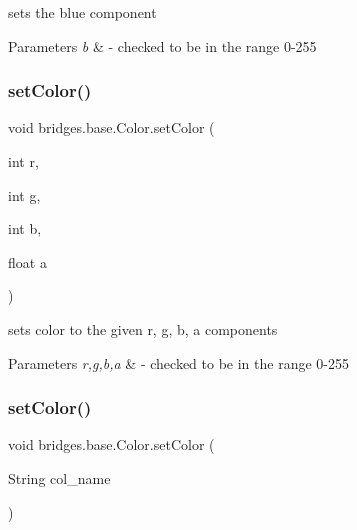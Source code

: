 sets the blue component


\begin{DoxyParams}{Parameters}
{\em b} & -\/ checked to be in the range 0-\/255 \\
\hline
\end{DoxyParams}
\hypertarget{classbridges_1_1base_1_1_color_a5559b1c7eb4c3901526b1012029b528f}{}\label{classbridges_1_1base_1_1_color_a5559b1c7eb4c3901526b1012029b528f} 
\subsubsection{\texorpdfstring{set\+Color()}{setColor()}\hspace{0.1cm}{\footnotesize\ttfamily [1/2]}}
{\footnotesize\ttfamily void bridges.\+base.\+Color.\+set\+Color (\begin{DoxyParamCaption}\item[{int}]{r,  }\item[{int}]{g,  }\item[{int}]{b,  }\item[{float}]{a }\end{DoxyParamCaption})}

sets color to the given r, g, b, a components


\begin{DoxyParams}{Parameters}
{\em r,g,b,a} & -\/ checked to be in the range 0-\/255 \\
\hline
\end{DoxyParams}
\hypertarget{classbridges_1_1base_1_1_color_a54dcd31227bde0f5d0a4f5d3b5a24ed2}{}\label{classbridges_1_1base_1_1_color_a54dcd31227bde0f5d0a4f5d3b5a24ed2} 
\subsubsection{\texorpdfstring{set\+Color()}{setColor()}\hspace{0.1cm}{\footnotesize\ttfamily [2/2]}}
{\footnotesize\ttfamily void bridges.\+base.\+Color.\+set\+Color (\begin{DoxyParamCaption}\item[{String}]{col\+\_\+name }\end{DoxyParamCaption})}

